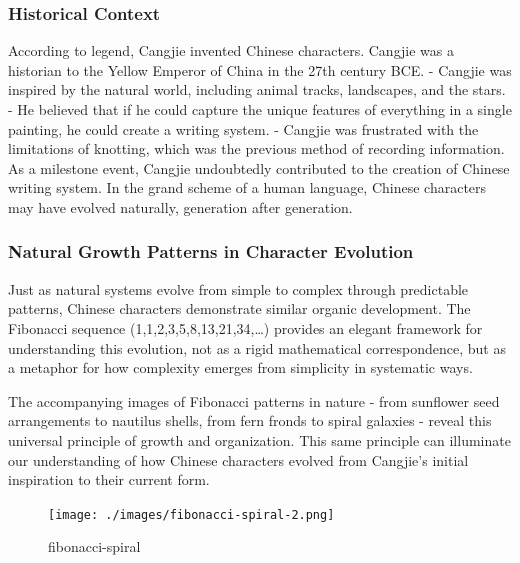 \hypertarget{historical-context}{%
\subsubsection{Historical Context}\label{historical-context}}

According to legend, Cangjie invented Chinese characters. Cangjie was a
historian to the Yellow Emperor of China in the 27th century BCE. -
Cangjie was inspired by the natural world, including animal tracks,
landscapes, and the stars. - He believed that if he could capture the
unique features of everything in a single painting, he could create a
writing system. - Cangjie was frustrated with the limitations of
knotting, which was the previous method of recording information. As a
milestone event, Cangjie undoubtedly contributed to the creation of
Chinese writing system. In the grand scheme of a human language, Chinese
characters may have evolved naturally, generation after generation.

\hypertarget{natural-growth-patterns-in-character-evolution}{%
\subsubsection{Natural Growth Patterns in Character
Evolution}\label{natural-growth-patterns-in-character-evolution}}

Just as natural systems evolve from simple to complex through
predictable patterns, Chinese characters demonstrate similar organic
development. The Fibonacci sequence (1,1,2,3,5,8,13,21,34,\ldots)
provides an elegant framework for understanding this evolution, not as a
rigid mathematical correspondence, but as a metaphor for how complexity
emerges from simplicity in systematic ways.

The accompanying images of Fibonacci patterns in nature - from sunflower
seed arrangements to nautilus shells, from fern fronds to spiral
galaxies - reveal this universal principle of growth and organization.
This same principle can illuminate our understanding of how Chinese
characters evolved from Cangjie's initial inspiration to their current
form.

\begin{figure}
\centering
\texttt{[image: ./images/fibonacci-spiral-2.png]}
\caption{fibonacci-spiral}
\end{figure}

